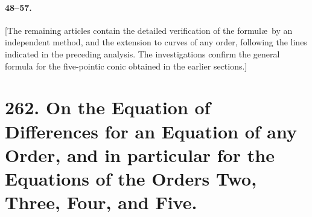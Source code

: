 \documentclass[12pt,a4paper]{article}
\theoremstyle{plain}
\begin{document}
\paragraph{48--57.}
[The  remaining  articles  contain  the  detailed  verification  of  the  formul\ae\  by  an
independent  method,  and  the  extension  to  curves  of  any  order,  following  the  lines
indicated  in  the  preceding  analysis.  The  investigations  confirm  the  general  formula
for  the  five-pointic  conic  obtained  in  the  earlier  sections.]


\newpage
\section*{262. On the Equation of Differences for an Equation of any Order, and in particular for the Equations of the Orders Two, Three, Four, and Five.}
\label{sec:paper262}


\medskip
\end{document}
